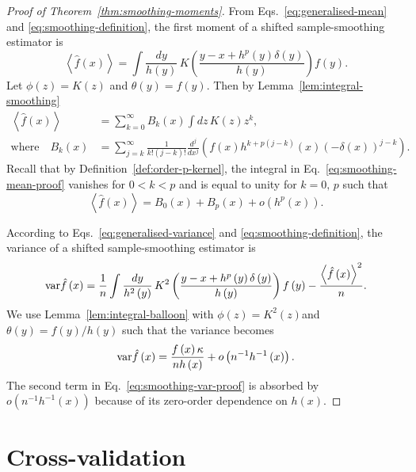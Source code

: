 \begin{proof}[Proof of Theorem~\ref{thm:smoothing-moments}]
From Eqs.~\eqref{eq:generalised-mean} and \eqref{eq:smoothing-definition}, the first moment of a shifted sample-smoothing estimator is
\[
\left\langle \hat{f}\left(x\right)\right\rangle =\int\frac{dy}{h\left(y\right)}\,K\left(\frac{y-x+h^{p}\left(y\right)\delta\left(y\right)}{h\left(y\right)}\right)f\left(y\right).
\]
Let $\phi\left(z\right)=K\left(z\right)$ and $\theta\left(y\right)=f\left(y\right)$. Then by Lemma~\ref{lem:integral-smoothing}
\begin{align}
\left\langle \hat{f}\left(x\right)\right\rangle  & =\sum_{k=0}^{\infty}B_{k}\left(x\right)\int dz\,K\left(z\right)z^{k},\label{eq:smoothing-mean-proof}\\
\text{where}\quad B_{k}\left(x\right) & =\sum_{j=k}^{\infty}\frac{1}{k!\left(j-k\right)!}\frac{d^{j}}{dx^{j}}\left(f\left(x\right)h^{k+p\left(j-k\right)}\left(x\right)\left(-\delta\left(x\right)\right)^{j-k}\right).\nonumber 
\end{align}
Recall that by Definition~\ref{def:order-p-kernel}, the integral in Eq.~\eqref{eq:smoothing-mean-proof} vanishes for $0<k<p$ and is equal to unity for $k=0,\,p$ such that
\[
\left\langle \hat{f}\left(x\right)\right\rangle =B_{0}\left(x\right)+B_{p}\left(x\right)+o\left(h^{p}\left(x\right)\right).
\]


According to Eqs.~\eqref{eq:generalised-variance} and \eqref{eq:smoothing-definition}, the variance of a shifted sample-smoothing estimator is
\begin{equation}
\mathrm{var}\hat{f}\left(x\right)=\frac{1}{n}\int\frac{dy}{h^{2}\left(y\right)}\,K^{2}\left(\frac{y-x+h^{p}\left(y\right)\delta\left(y\right)}{h\left(y\right)}\right)f\left(y\right)-\frac{\left\langle \hat{f}\left(x\right)\right\rangle ^{2}}{n}.\label{eq:smoothing-var-proof}
\end{equation}
We use Lemma~\ref{lem:integral-balloon} with $\phi\left(z\right)=K^{2}\left(z\right)$and $\theta\left(y\right)=f\left(y\right)/h\left(y\right)$ such that the variance becomes
\[
\mathrm{var}\hat{f}\left(x\right)=\frac{f\left(x\right)\kappa}{nh\left(x\right)}+o\left(n^{-1}h^{-1}\left(x\right)\right).
\]
The second term in Eq.~\eqref{eq:smoothing-var-proof} is absorbed by $o\left(n^{-1}h^{-1}\left(x\right)\right)$ because of its zero-order dependence on $h$$\left(x\right)$.
\end{proof}

\section{Cross-validation}

